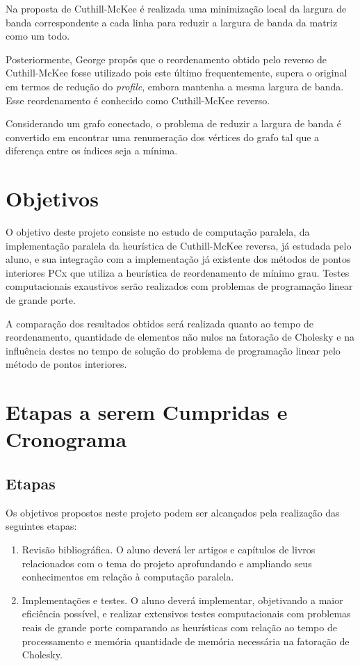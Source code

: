 \documentclass[12pt]{article}
\begin{document}
Na proposta de Cuthill-McKee é realizada uma minimização local da
largura de banda correspondente a cada linha para reduzir a largura de
banda da matriz como um todo.

Posteriormente, George \cite{Geo71} propôs que o reordenamento obtido pelo
reverso de Cuthill-McKee fosse utilizado pois este último
frequentemente, supera o original em termos de redução do {\it profile},
embora mantenha a mesma largura de banda. Esse reordenamento é conhecido
como Cuthill-McKee reverso.

Considerando um grafo conectado, o problema de reduzir a largura de banda
é convertido em encontrar uma renumeração dos vértices do grafo tal que
a diferença entre os índices seja a mínima.

\section{Objetivos}
O objetivo deste projeto consiste no estudo de computação paralela, da
implementação paralela da heurística de Cuthill-McKee reversa, já estudada pelo
aluno, e sua integração
com a implementação já existente dos métodos de pontos interiores PCx
\cite{CMWW96} que utiliza a heurística de reordenamento de mínimo grau. Testes
computacionais exaustivos serão realizados com problemas de programação linear
de grande porte.

A comparação dos resultados obtidos será realizada quanto ao tempo de
reordenamento, quantidade de elementos não nulos na fatoração de Cholesky
e na influência destes no tempo de solução do problema de programação linear
pelo método de pontos interiores.

\section{Etapas a serem Cumpridas e Cronograma}
\subsection{Etapas}
Os objetivos propostos neste projeto podem ser alcançados pela realização das
seguintes etapas:
\begin{enumerate}
\item Revisão bibliográfica. O aluno deverá ler artigos e capítulos de livros
relacionados com o tema do projeto aprofundando e ampliando seus
conhecimentos em relação à computação paralela.
\item Implementações e testes. O aluno deverá implementar, objetivando
a maior eficiência possível, e realizar extensivos testes computacionais com
problemas reais de grande porte comparando as heurísticas com relação ao tempo
de processamento e memória quantidade de memória necessária na fatoração de
Cholesky.
\end{enumerate}
\end{document}
